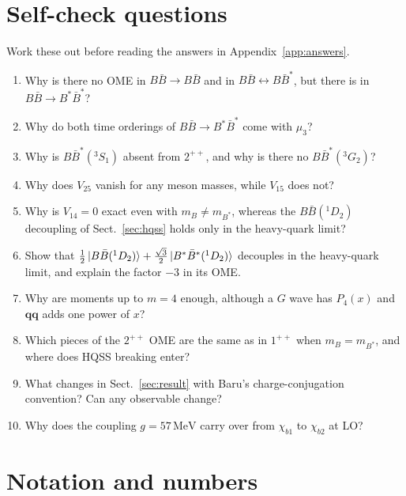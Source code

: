 \documentclass[11pt,a4paper]{article}
\newcommand{\BB}{B\bar B}
\newcommand{\BBst}{B\bar B^*}
\newcommand{\BstBst}{B^*\bar B^*}
\newcommand{\MeV}{\,\mathrm{MeV}}
\newcommand{\vq}{\bm q}
\begin{document}
\section{Self-check questions}
\label{sec:selfcheck}

Work these out before reading the answers in Appendix~\ref{app:answers}.
\begin{enumerate}
\item Why is there no OME in $\BB\to\BB$ and in $\BB\leftrightarrow\BBst$, but there is in $\BB\to\BstBst$?
\item Why do both time orderings of $\BB\to\BstBst$ come with $\mu_3$?
\item Why is $\BBst(^3S_1)$ absent from $2^{++}$, and why is there no $\BBst(^3G_2)$?
\item Why does $V_{25}$ vanish for any meson masses, while $V_{15}$ does not?
\item Why is $V_{14}=0$ exact even with $m_B\neq m_{B^*}$, whereas the $\BB(^1D_2)$ decoupling of Sect.~\ref{sec:hqss} holds only in the heavy-quark limit?
\item Show that $\frac12\ket{\BB(^1D_2)}+\frac{\sqrt3}{2}\ket{\BstBst(^1D_2)}$ decouples in the heavy-quark limit, and explain the factor $-3$ in its OME.
\item Why are moments up to $m=4$ enough, although a $G$ wave has $P_4(x)$ and $\vq\vq$ adds one power of $x$?
\item Which pieces of the $2^{++}$ OME are the same as in $1^{++}$ when $m_B=m_{B^*}$, and where does HQSS breaking enter?
\item What changes in Sect.~\ref{sec:result} with Baru's charge-conjugation convention? Can any observable change?
\item Why does the coupling $g=57\MeV$ carry over from $\chi_{b1}$ to $\chi_{b2}$ at LO?
\end{enumerate}

\appendix

\section{Notation and numbers}
\end{document}

